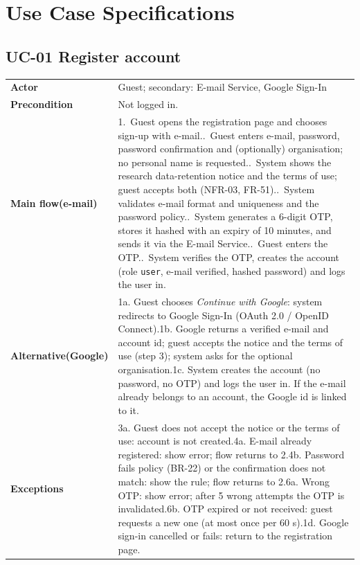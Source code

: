 \documentclass[11pt,a4paper]{article}
\begin{document}
\clearpage
\section{Use Case Specifications}
\noindent\begin{minipage}{\linewidth}
\subsection*{UC-01 Register account}
\begin{tabularx}{\linewidth}{@{}>{\raggedright\leavevmode\bfseries\color{creBlue}}p{2.6cm} Y@{}}
\toprule
Actor & Guest; secondary: E-mail Service, Google Sign-In \\
Precondition & Not logged in. \\
Main flow\newline (e-mail) & 1.~Guest opens the registration page and chooses sign-up with e-mail..~Guest enters e-mail, password, password confirmation and (optionally) organisation; no personal name is requested..~System shows the research data-retention notice and the terms of use; guest accepts both (NFR-03, FR-51)..~System validates e-mail format and uniqueness and the password policy..~System generates a 6-digit OTP, stores it hashed with an expiry of 10 minutes, and sends it via the E-mail Service..~Guest enters the OTP..~System verifies the OTP, creates the account (role \texttt{user}, e-mail verified, hashed password) and logs the user in. \\
Alternative\newline (Google) & 1a. Guest chooses \emph{Continue with Google}: system redirects to Google Sign-In (OAuth 2.0 / OpenID Connect).\newline 1b. Google returns a verified e-mail and account id; guest accepts the notice and the terms of use (step 3); system asks for the optional organisation.\newline 1c. System creates the account (no password, no OTP) and logs the user in. If the e-mail already belongs to an account, the Google id is linked to it. \\
Exceptions & 3a. Guest does not accept the notice or the terms of use: account is not created.\newline 4a. E-mail already registered: show error; flow returns to 2.\newline 4b. Password fails policy (BR-22) or the confirmation does not match: show the rule; flow returns to 2.\newline 6a. Wrong OTP: show error; after 5 wrong attempts the OTP is invalidated.\newline 6b. OTP expired or not received: guest requests a new one (at most once per 60 s).\newline 1d. Google sign-in cancelled or fails: return to the registration page. \\

\end{tabularx}
\end{minipage}
\end{document}

